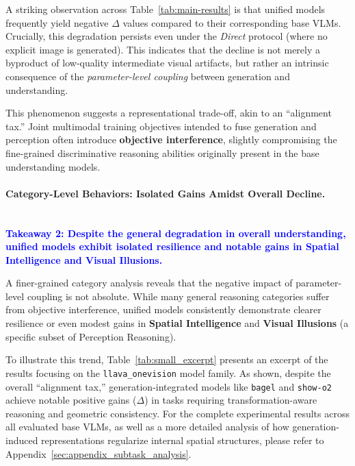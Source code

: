 \documentclass{article}
\theoremstyle{plain}
\theoremstyle{definition}
\theoremstyle{remark}
\begin{document}
A striking observation across Table~\ref{tab:main-results} is that unified models frequently yield negative $\Delta$ values compared to their corresponding base VLMs. Crucially, this degradation persists even under the \emph{Direct} protocol (where no explicit image is generated). This indicates that the decline is not merely a byproduct of low-quality intermediate visual artifacts, but rather an intrinsic consequence of the \emph{parameter-level coupling} between generation and understanding. 

This phenomenon suggests a representational trade-off, akin to an ``alignment tax.'' Joint multimodal training objectives intended to fuse generation and perception often introduce \textbf{objective interference}, slightly compromising the fine-grained discriminative reasoning abilities originally present in the base understanding models.

\paragraph{Category-Level Behaviors: Isolated Gains Amidst Overall Decline.} 
~\\
\textbf{\textcolor{blue}{Takeaway 2: Despite the general degradation in overall understanding, unified models exhibit isolated resilience and notable gains in Spatial Intelligence and Visual Illusions.}}

A finer-grained category analysis reveals that the negative impact of parameter-level coupling is not absolute. While many general reasoning categories suffer from objective interference, unified models consistently demonstrate clearer resilience or even modest gains in \textbf{Spatial Intelligence} and \textbf{Visual Illusions} (a specific subset of Perception Reasoning). 

To illustrate this trend, Table~\ref{tab:small_excerpt} presents an excerpt of the results focusing on the \texttt{llava\_onevision} model family. As shown, despite the overall ``alignment tax,'' generation-integrated models like \texttt{bagel} and \texttt{show-o2} achieve notable positive gains ($\Delta$) in tasks requiring transformation-aware reasoning and geometric consistency. For the complete experimental results across all evaluated base VLMs, as well as a more detailed analysis of how generation-induced representations regularize internal spatial structures, please refer to Appendix~\ref{sec:appendix_subtask_analysis}.
\end{document}
